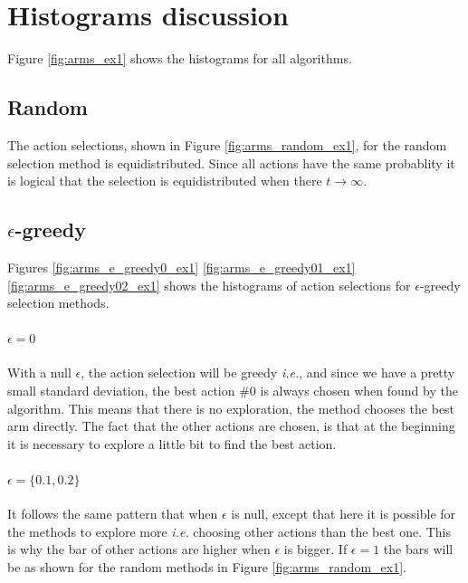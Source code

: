 \documentclass[letterpaper]{article}
\begin{document}
\section{Histograms discussion}

\label{sec:ex1_histo}

Figure \ref{fig:arms_ex1} shows the histograms for all algorithms.

\subsection*{Random}

The action selections, shown in Figure \ref{fig:arms_random_ex1},
for the random selection method is equidistributed.
Since all actions have the same probablity it is logical that the selection
is equidistributed when there $t \to \infty$.

\subsection*{$\epsilon$-greedy}


Figures \ref{fig:arms_e_greedy0_ex1}
\ref{fig:arms_e_greedy01_ex1}
\ref{fig:arms_e_greedy02_ex1} shows the histograms of action selections
for $\epsilon$-greedy selection methods.

\paragraph{$\epsilon = 0$}

With a null $\epsilon$, the action selection will be greedy \textit{i.e.},
and since we have a pretty small standard deviation, the best action \#0
is always chosen when found by the algorithm. This means that there is
no exploration, the method chooses the best arm directly. The fact that
the other actions are chosen, is that at the beginning it is necessary
to explore a little bit to find the best action.

\paragraph{$\epsilon = \{0.1, 0.2\}$}

It follows the same pattern that when $\epsilon$ is null, except that here
it is possible for the methods to explore more \textit{i.e.} choosing
other actions than the best one. This is why the bar of other actions
are higher when $\epsilon$ is bigger. If $\epsilon = 1$ the bars will
be as shown for the random methods in Figure \ref{fig:arms_random_ex1}.
\end{document}
